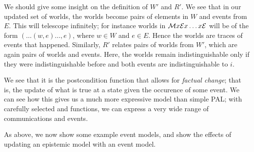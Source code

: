 \documentclass[10pt, a4paper]{report}
\begin{document}
We should give some insight on the definition of $W'$ and $R'$. We see that in
our updated set of worlds, the worlds become pairs of elements in $W$ and events
from $E$. This will telescope infinitely; for instance worlds in $\mathcal{M} x
\mathcal{E} x \ldots x \mathcal{E}$ will be of the form $(\ldots (w ,e) \ldots, e)$, where
$w \in W$ and $e \in E$. Hence the worlds are traces of events that happened.
Similarly, $R'$ relates pairs of worlds from $W'$, which are again pairs of
worlds and events. Here, the worlds remain indistinguishable only if they were
indistinguishable before and both events are indistinguishable to $i$.

We see that it is the postcondition function that allows for \emph{factual
  change}; that is, the update of what is true at a state given the occurence of
some event. We can see how this gives us a much more expressive model than
simple PAL; with carefully selected \tpre and \tpost functions, we can express a
very wide range of communications and events. 

\bigskip \bigskip \bigskip

As above, we now show some example event models, and show the effects of
updating an epistemic model with an event model.
\end{document}
